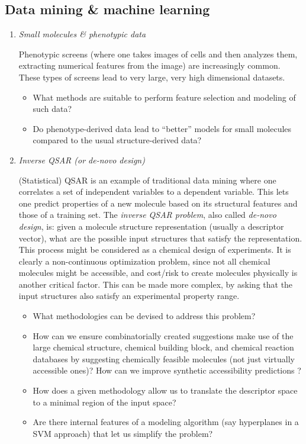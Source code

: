 \documentclass{sig-alternate}
\begin{document}
\subsection*{Data mining \& machine learning}
\begin{enumerate}


\item \emph{Small molecules \& phenotypic data}

Phenotypic screens (where one takes images of cells and then analyzes them,
extracting numerical features from the image) are increasingly
common. These types of screens lead to very large, very high
dimensional datasets.
\begin{itemize}
\item What methods are suitable to perform feature selection and
  modeling of such data?
\item Do phenotype-derived data lead to ``better'' models for
  small molecules compared to the usual structure-derived data?
\end{itemize}

\item \emph{Inverse QSAR (or de-novo design)}

(Statistical) QSAR is an example of traditional data mining where one
correlates a set of independent variables to a dependent
variable. This lets one predict properties of a new molecule based on
its structural features and those of a training set. The \emph{inverse QSAR
problem}, also called \emph{de-novo design}, is: given a molecule structure representation
(usually a descriptor vector), what are the possible input structures
that satisfy the representation. This process might be considered as
a chemical design of experiments. It is clearly a non-continuous optimization problem, since
not all chemical molecules might be accessible, and cost/risk to create molecules physically is another
critical factor. This can be made more complex, by
asking that the input structures also satisfy an experimental property
range.
\begin{itemize}
\item What methodologies can be devised to address this problem?
\item How can we ensure combinatorially created suggestions make use of the large
chemical structure, chemical building block, and chemical reaction databases by suggesting
chemically feasible molecules (not just virtually accessible ones)? How can we improve
synthetic accessibility predictions \cite{Boda_Seidel_Gasteiger_2007}?
\item How does a given methodology allow us to translate the
  descriptor space to a minimal region of the input space?
\item Are there internal features of a modeling algorithm (say
  hyperplanes in a SVM approach) that let us simplify the problem?
\end{itemize}


\end{enumerate}
\end{document}
